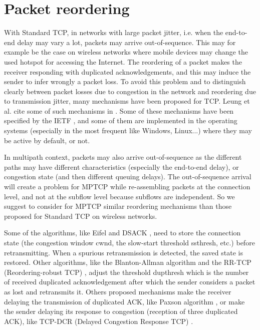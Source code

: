 \documentclass{sig-alternate}
\begin{document}
\section{Packet reordering}\label{sec:reordering}
With Standard TCP, in networks with large packet jitter, i.e. when the end-to-end delay may vary a lot, packets may arrive out-of-sequence. This may for example be the case on wireless networks where mobile devices may change the used hotspot for accessing the Internet. The reordering of a packet makes the receiver responding with duplicated acknowledgements, and this may induce the sender to infer wrongly a packet loss. To avoid this problem and to distinguish clearly between packet losses due to congestion in the network and reordering due to transmission jitter, many mechanisms have been proposed for TCP. Leung et al. cite some of such mechanisms in \cite{leung07}. Some of these mechanisms have been specified by the IETF \cite{EifelRFC} \cite{DsackRFC} \cite{FrtoRFC}, and some of them are implemented in the operating systems \cite{FrtoRFC} (especially in the most frequent like Windows, Linux...) where they may be active by default, or not. 

In multipath context, packets may also arrive out-of-sequence as the different paths may have different characteristics (especially the end-to-end delay), or congestion state (and then different queuing delays). The out-of-sequence arrival will create a problem for MPTCP while re-assembling packets at the connection level, and not at the subflow level because subflows are independent. So we suggest to consider for MPTCP similar reordering mechanisms than those proposed for Standard TCP on wireless networks. 

Some of the algorithms, like Eifel \cite{EifelRFC} \cite{Eifel} and DSACK \cite{DsackRFC}, need to store the connection state (the congestion window cwnd, the slow-start threshold ssthresh, etc.) before retransmitting. When a spurious retransmission is detected, the saved state is restored. Other algorithms, like the Blanton-Allman algorithm \cite{leung07} and the RR-TCP (Reordering-robust TCP) \cite{leung07}, adjust the threshold dupthresh which is the number of received duplicated acknowledgement after which the sender considers a packet as lost and retransmits it. Others proposed mechanisms make the receiver delaying the transmission of duplicated ACK, like Paxson algorithm \cite{leung07}, or make the sender delaying its response to congestion (reception of three duplicated ACK),  like TCP-DCR (Delayed Congestion Response TCP) \cite{leung07}.  
\end{document}
